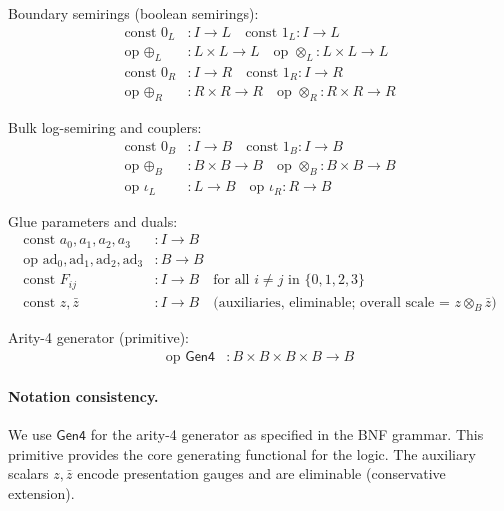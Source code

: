 \begin{definition}
\label{def:primitive-symbols}
Boundary semirings (boolean semirings):
\begin{align}
\text{const } 0_L &: I \to L \quad \text{const } 1_L : I \to L \\
\text{op } \oplus_L &: L \times L \to L \quad \text{op } \otimes_L : L \times L \to L \\
\text{const } 0_R &: I \to R \quad \text{const } 1_R : I \to R \\
\text{op } \oplus_R &: R \times R \to R \quad \text{op } \otimes_R : R \times R \to R
\end{align}

Bulk log-semiring and couplers:
\begin{align}
\text{const } 0_B &: I \to B \quad \text{const } 1_B : I \to B \\
\text{op } \oplus_B &: B \times B \to B \quad \text{op } \otimes_B : B \times B \to B \\
\text{op } \iota_L &: L \to B \quad \text{op } \iota_R : R \to B
\end{align}

Glue parameters and duals:
\begin{align}
\text{const } a_0, a_1, a_2, a_3 &: I \to B \\
\text{op } \text{ad}_0, \text{ad}_1, \text{ad}_2, \text{ad}_3 &: B \to B \\
\text{const } F_{ij} &: I \to B \quad \text{for all } i \neq j \text{ in } \{0,1,2,3\} \\
\text{const } z, \bar{z} &: I \to B \quad \text{(auxiliaries, eliminable; overall scale = } z \otimes_B \bar{z}\text{)}
\end{align}

Arity-4 generator (primitive):
\begin{align}
\text{op } \mathsf{Gen4} &: B \times B \times B \times B \to B
\end{align}
\end{definition}

\paragraph{Notation consistency.} We use $\mathsf{Gen4}$ for the arity-4 generator as specified in the BNF grammar. This primitive provides the core generating functional for the logic. The auxiliary scalars $z, \bar{z}$ encode presentation gauges and are eliminable (conservative extension).

